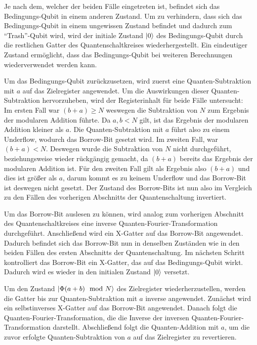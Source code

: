 Je nach dem, welcher der beiden Fälle eingetreten ist, befindet sich das Bedingungs-Qubit in einem anderen Zustand.
Um zu verhindern, dass sich das Bedingungs-Qubit in einem ungewissen Zustand befindet und dadurch zum "`Trash"'-Qubit wird, 
wird der initiale Zustand \(\ket{0}\) des Bedingungs-Qubit durch die restlichen Gatter des Quantenschaltkreises wiederhergestellt.
Ein eindeutiger Zustand ermöglicht, dass das Bedingungs-Qubit bei weiteren Berechnungen wiederverwendet werden kann.

Um das Bedingungs-Qubit zurückzusetzen, 
wird zuerst eine Quanten-Subtraktion mit \(a\) auf das Zielregister angewendet.
Um die Auswirkungen dieser Quanten-Subtraktion hervorzuheben, wird der Registerinhalt für beide Fälle untersucht:
Im ersten Fall war \((b+a) \geq N\) weswegen die Subtraktion von \(N\) zum Ergebnis der modularen Addition führte.
Da \(a, b < N\) gilt, ist das Ergebnis der modularen Addition kleiner als \(a\).
Die Quanten-Subtraktion mit \(a\) führt also zu einem Underflow, wodurch das Borrow-Bit gesetzt wird.
Im zweiten Fall, war \((b+a) < N\).
Deswegen wurde die Subtraktion von \(N\) nicht durchgeführt, 
beziehungsweise wieder rückgängig gemacht, da \((b+a)\) bereits das Ergebnis der modularen Addition ist.
Für den zweiten Fall gilt als Ergebnis also \((b+a)\) und dies ist größer als \(a\), 
darum kommt es zu keinem Underflow und das Borrow-Bit ist deswegen nicht gesetzt.
Der Zustand des Borrow-Bits ist nun also im Vergleich zu den Fällen des vorherigen Abschnitts der Quantenschaltung invertiert.

Um das Borrow-Bit auslesen zu können, 
wird analog zum vorherigen Abschnitt des Quantenschaltkreises eine inverse Quanten-Fourier-Transformation durchgeführt.
Anschließend wird ein X-Gatter auf das Borrow-Bit angewendet.
Dadurch befindet sich das Borrow-Bit nun in denselben Zuständen wie in den beiden Fällen des ersten Abschnitts der Quantenschaltung.
Im nächsten Schritt kontrolliert das Borrow-Bit ein X-Gatter, das auf das Bedingungs-Qubit wirkt.
Dadurch wird es wieder in den initialen Zustand \(\ket{0}\) versetzt.

Um den Zustand \(\ket{\Phi(a+b)\mod N}\) des Zielregister wiederherzustellen, 
werden die Gatter bis zur Quanten-Subtraktion mit \(a\) inverse angewendet.
Zunächst wird ein selbstinverses X-Gatter auf das Borrow-Bit angewendet.
Danach folgt die Quanten-Fourier-Transformation, 
die die Inverse der inversen Quanten-Fourier-Transformation darstellt.
Abschließend folgt die Quanten-Addition mit \(a\), 
um die zuvor erfolgte Quanten-Subtraktion von \(a\) auf das Zielregister zu revertieren.


